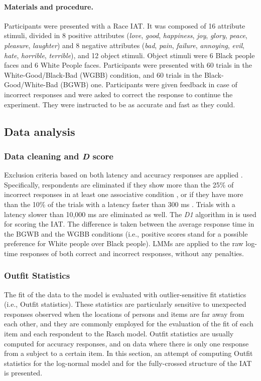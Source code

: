 \documentclass[12pt]{book}
\begin{document}
\paragraph{Materials and procedure.}
Participants were presented with a Race IAT. It was composed of 16 attribute stimuli, divided in 8 positive attributes (\emph{love},  \emph{good}, \emph{happiness}, \emph{joy}, \emph{glory}, \emph{peace}, \emph{pleasure}, \emph{laughter}) and 8 negative attributes (\emph{bad}, \emph{pain}, \emph{failure}, \emph{annoying}, \emph{evil}, \emph{hate}, \emph{horrible}, \emph{terrible}), and 12 object stimuli. Object stimuli \cite<same as those in Study 2 in>{nosek2005} were 6 Black people faces and 6 White People faces. Participants were presented with 60 trials in the White-Good/Black-Bad (WGBB) condition, and 60 trials in the Black-Good/White-Bad (BGWB) one. Participants were given feedback in case of incorrect responses and were asked to correct the response to continue the experiment. They were instructed to be as accurate and fast as they could. 

\subsection{Data analysis}
\subsubsection{Data cleaning and \emph{D} score} \label{sub:cleaning}
Exclusion criteria based on both latency and accuracy responses are applied \cite{Greenwald2003, Nosek2002}. 
Specifically, respondents are eliminated if they show more than the 25\% of incorrect responses in at least one associative condition \cite{Nosek2002}, or if they have more than the 10\% of the trials with a latency faster than 300 ms \cite{Greenwald2003}. 
Trials with a latency slower than 10,000 ms are eliminated as well.
The  \emph{D1} algorithm in  is used for scoring the IAT. The difference is taken between the average response time in the BGWB and the WGBB conditions (i.e., positive scores stand for a possible preference for White people over Black people). 
LMMs are applied to the raw log-time responses of both correct and incorrect responses, without any penalties.

\subsubsection{Outfit Statistics}\label{sec:outfit}
The fit of the data to the model is evaluated with outlier-sensitive fit statistics (i.e., Outfit  statistics). These statistics are particularly sensitive to unexpected responses observed when the locations of persons and items are far away from each other, and they are commonly employed for the evaluation of the fit of each item and each respondent to the Rasch model. Outfit statistics are usually computed for accuracy responses, and on data where there is only one response from a subject to a certain item.
	In this section, an attempt of computing Outfit statistics for the log-normal model and for the fully-crossed structure of the IAT is presented.
\end{document}
